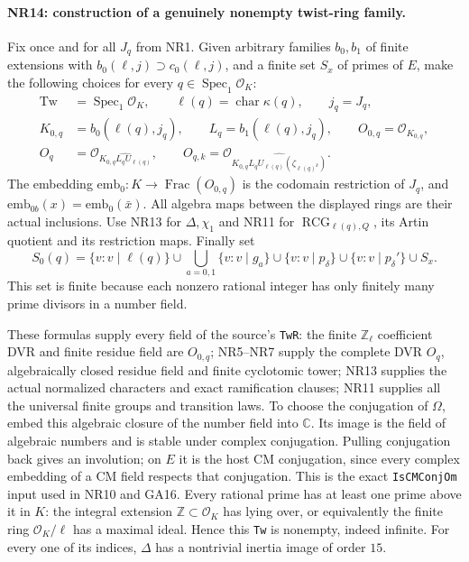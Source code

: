 \paragraph{NR14: construction of a genuinely nonempty twist-ring family.}
Fix once and for all $J_q$ from NR1. Given arbitrary families
$b_0,b_1$ of finite extensions with $b_0(\ell,j)\supset c_0(\ell,j)$,
and a finite set $S_x$ of primes of $E$, make the following choices
for every $q\in\operatorname{Spec}_1\mathcal O_K$:
\[
 \begin{split}
 \mathrm{Tw}&=\operatorname{Spec}_1\mathcal O_K,\qquad
 \ell(q)=\operatorname{char}\kappa(q),\qquad j_q=J_q,\\
 K_{0,q}&=b_0(\ell(q),j_q),\qquad
 L_q=b_1(\ell(q),j_q),\qquad O_{0,q}=\mathcal O_{K_{0,q}},\\
 O_q&=\mathcal O_{\widehat{K_{0,q}L_qU_{\ell(q)}}},\qquad
 O_{q,k}=\mathcal O_{\widehat{K_{0,q}L_qU_{\ell(q)}
                                      (\zeta_{\ell(q)^k})}}.
 \end{split}                                                   \tag{NR.26}
\]
The embedding $\mathrm{emb}_0:K\to\operatorname{Frac}(O_{0,q})$
is the codomain restriction of $J_q$, and
$\mathrm{emb}_{0b}(x)=\mathrm{emb}_0(\bar x)$. All algebra maps
between the displayed rings are their actual inclusions.
Use NR13 for $\Delta,\chi_1$ and NR11 for
$\operatorname{RCG}_{\ell(q),Q}$, its Artin quotient and its
restriction maps. Finally set
\[
 S_0(q)=\{v:v\mid\ell(q)\}\cup
       \bigcup_{a=0,1}\{v:v\mid g_a\}\cup
       \{v:v\mid p_\delta\}\cup\{v:v\mid p_\delta'\}\cup S_x.
                                                               \tag{NR.27}
\]
This set is finite because each nonzero rational integer has
only finitely many prime divisors in a number field.

These formulas supply every field of the source's \texttt{TwR}:
the finite $\mathbb Z_\ell$ coefficient DVR and finite residue
field are $O_{0,q}$; NR5--NR7 supply the complete DVR $O_q$,
algebraically closed residue field and finite cyclotomic tower;
NR13 supplies the actual normalized characters and exact
ramification clauses; NR11 supplies all the universal finite
groups and transition laws. To choose the conjugation of
$\Omega$, embed this algebraic closure of the number field into
$\mathbb C$. Its image is the field of algebraic numbers and
is stable under complex conjugation. Pulling conjugation back
gives an involution; on $E$ it is the host CM conjugation, since
every complex embedding of a CM field respects that conjugation.
This is the exact \texttt{IsCMConjOm} input used in NR10 and GA16.
Every rational prime has at least one prime above it in $K$:
the integral extension $\mathbb Z\subset\mathcal O_K$ has lying
over, or equivalently the finite ring $\mathcal O_K/\ell$ has a
maximal ideal. Hence this \texttt{Tw} is nonempty, indeed infinite.
For every one of its indices, $\Delta$ has a nontrivial inertia
image of order $15$.

